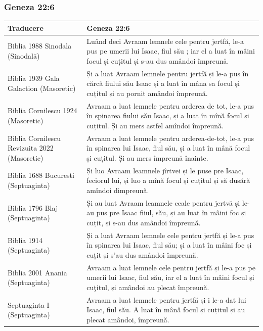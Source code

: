 \documentclass[12pt,a4paper]{article}
\begin{document}
\subsubsection{Geneza 22:6}

\begin{longtable}{|p{3cm}|L|}
    \hline
    \textbf{Traducere}                           & \textbf{Geneza 22:6}                                                                                                                                         \\
    \hline
    Biblia 1988 Sinodala (Sinodală)              & Luând deci Avraam lemnele cele pentru jertfă, le-a pus pe umerii lui Isaac, fiul său ; iar el a luat în mâini focul și cuțitul și s-au dus amândoi împreună. \\
    \hline
    Biblia 1939 Gala Galaction (Masoretic)       & Și a luat Avraam lemnele pentru jertfă și le-a pus în cărcă fiului său Isaac și a luat în mâna sa focul și cuțitul și au pornit amândoi împreună.            \\
    \hline
    Biblia Cornilescu 1924 (Masoretic)           & Avraam a luat lemnele pentru arderea de tot, le-a pus în spinarea fiului său Isaac, și a luat  în mînă focul și cuțitul. Și au mers astfel amîndoi împreună. \\
    \hline
    Biblia Cornilescu Revizuita 2022 (Masoretic) & Avraam a luat lemnele pentru arderea-de-tot, le-a pus în spinarea lui Isaac, fiul său, și a luat în mână focul și cuțitul. Și au mers împreună înainte.      \\
    \hline
    Biblia 1688 Bucuresti (Septuaginta)          & Și luo Avraam leamnele jîrtvei și le puse pre Isaac, feciorul lui, și luo a mînă focul și cuțitul și să dusără amîndoi dimpreună.                            \\
    \hline
    Biblia 1796 Blaj (Septuaginta)               & Și au luat Avraam leamnele ceale pentru jertvă și le-au pus pre Isaac fiiul, său, și au luat în mâini foc și cuțit, și s-au dus amândoi împreună.            \\
    \hline
    Biblia 1914 (Septuaginta)                    & Și a luat Avraam lemnele cele pentru jertfă și le-a pus în spinarea lui Isaac, fiul său; și a luat în mâini foc și cuțit și s'au dus amândoi împreună.       \\
    \hline
    Biblia 2001 Anania (Septuaginta)             & Avraam a luat lemnele cele pentru jertfă și le-a pus pe umerii lui Isaac, fiul său, iar el a luat în mâini focul și cuţitul, și amândoi au plecat împreună.  \\
    \hline
    Septuaginta I (Septuaginta)                  & Avraam a luat lemnele pentru jertfă și i le-a dat lui Isaac, fiul său. A luat în mână focul și cuțitul și au plecat amândoi, împreună.                       \\
    \hline
\end{longtable}
\end{document}
